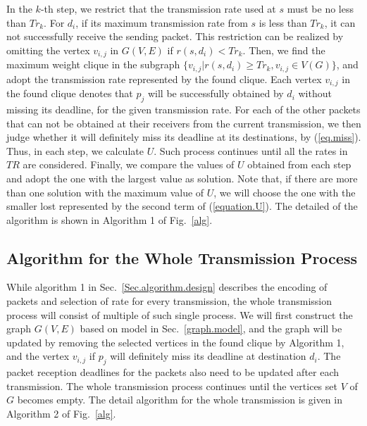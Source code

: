 \documentclass[journal]{IEEEtran}
\begin{document}
In the $k$-th step, we restrict that the transmission rate used at $s$ must be no less than $Tr_k$. For $d_i$, if its maximum transmission rate from $s$ is less than $Tr_k$, it can not successfully receive the sending packet. This restriction can be realized by omitting the vertex $v_{i,j}$ in $G(V,E)$ if $r(s,d_i)< Tr_k$. Then, we find the maximum weight clique in the subgraph $\{v_{i,j}|r(s,d_i)\geq Tr_k,v_{i,j}\in V(G)\}$, and adopt the transmission rate represented by the found clique. Each vertex $v_{i,j}$ in the found clique denotes that $p_j$ will be successfully obtained by $d_i$ without missing its deadline, for the given transmission rate. For each of the other packets that can not be obtained at their receivers from the current transmission, we then judge whether it will definitely miss its deadline at its destinations, by (\ref{eq.miss}). Thus, in each step, we calculate $U$. Such process continues until all the rates in $TR$ are considered. Finally, we compare the values of $U$ obtained from each step and adopt the one with the largest value as solution.
Note that, if there are more than one solution with the maximum value of $U$, we will choose the one with the smaller lost represented by the second term of (\ref{equation.U}).
The detailed of the algorithm is shown in Algorithm 1 of Fig.~\ref{alg}.
\vspace{-0.1in}
\subsection{Algorithm for the Whole Transmission Process}\vspace{-0.02in}
While algorithm 1 in Sec.~\ref{Sec.algorithm.design} describes the encoding of packets and selection of rate for every transmission, the whole transmission process will consist of multiple of such single process. We will first construct the graph $G(V,E)$ based on model in Sec.~\ref{graph.model}, and the graph will be updated by removing the selected vertices in the found clique by Algorithm 1, and the vertex $v_{i,j}$ if $p_j$ will definitely miss its deadline at destination $d_i$. The packet reception deadlines for the packets also need to be updated after each transmission. The whole transmission process continues until the vertices set $V$ of $G$ becomes empty. The detail algorithm for the whole transmission is given in Algorithm 2 of Fig.~\ref{alg}.
\end{document}
